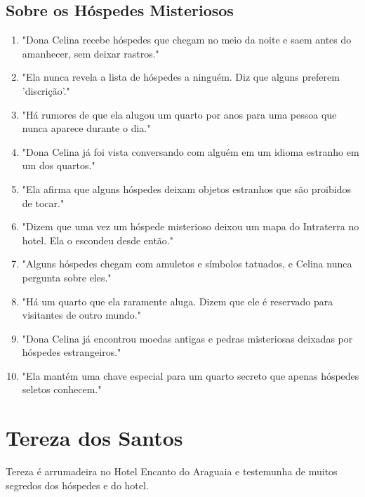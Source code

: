 \subsection*{Sobre os Hóspedes Misteriosos}
\begin{enumerate}
    \item "Dona Celina recebe hóspedes que chegam no meio da noite e saem antes do amanhecer, sem deixar rastros."
    \item "Ela nunca revela a lista de hóspedes a ninguém. Diz que alguns preferem 'discrição'."
    \item "Há rumores de que ela alugou um quarto por anos para uma pessoa que nunca aparece durante o dia."
    \item "Dona Celina já foi vista conversando com alguém em um idioma estranho em um dos quartos."
    \item "Ela afirma que alguns hóspedes deixam objetos estranhos que são proibidos de tocar."
    \item "Dizem que uma vez um hóspede misterioso deixou um mapa do Intraterra no hotel. Ela o escondeu desde então."
    \item "Alguns hóspedes chegam com amuletos e símbolos tatuados, e Celina nunca pergunta sobre eles."
    \item "Há um quarto que ela raramente aluga. Dizem que ele é reservado para visitantes de outro mundo."
    \item "Dona Celina já encontrou moedas antigas e pedras misteriosas deixadas por hóspedes estrangeiros."
    \item "Ela mantém uma chave especial para um quarto secreto que apenas hóspedes seletos conhecem."
\end{enumerate}

\section{Tereza dos Santos}
Tereza é arrumadeira no Hotel Encanto do Araguaia e testemunha de muitos segredos dos hóspedes e do hotel.

